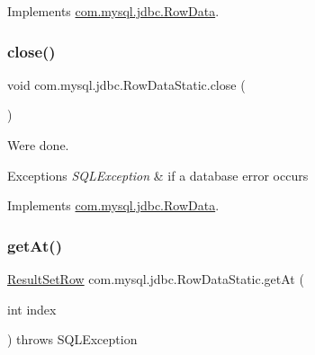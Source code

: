 Implements \mbox{\hyperlink{interfacecom_1_1mysql_1_1jdbc_1_1_row_data_a64bc800ad28a97c6ad1f7d6a4958c187}{com.\+mysql.\+jdbc.\+Row\+Data}}.

\mbox{\label{classcom_1_1mysql_1_1jdbc_1_1_row_data_static_a4c172a40caf7d38d4ae5441a9ea46d45}} 
\subsubsection{\texorpdfstring{close()}{close()}}
{\footnotesize\ttfamily void com.\+mysql.\+jdbc.\+Row\+Data\+Static.\+close (\begin{DoxyParamCaption}{ }\end{DoxyParamCaption})}

We\textquotesingle{}re done.


\begin{DoxyExceptions}{Exceptions}
{\em S\+Q\+L\+Exception} & if a database error occurs \\
\hline
\end{DoxyExceptions}


Implements \mbox{\hyperlink{interfacecom_1_1mysql_1_1jdbc_1_1_row_data_ac548da95fe41cee544964af3b6d734a6}{com.\+mysql.\+jdbc.\+Row\+Data}}.

\mbox{\label{classcom_1_1mysql_1_1jdbc_1_1_row_data_static_a02904125e29bcc258c12f839338a4937}} 
\subsubsection{\texorpdfstring{get\+At()}{getAt()}}
{\footnotesize\ttfamily \mbox{\hyperlink{classcom_1_1mysql_1_1jdbc_1_1_result_set_row}{Result\+Set\+Row}} com.\+mysql.\+jdbc.\+Row\+Data\+Static.\+get\+At (\begin{DoxyParamCaption}\item[{int}]{index }\end{DoxyParamCaption}) throws S\+Q\+L\+Exception}

